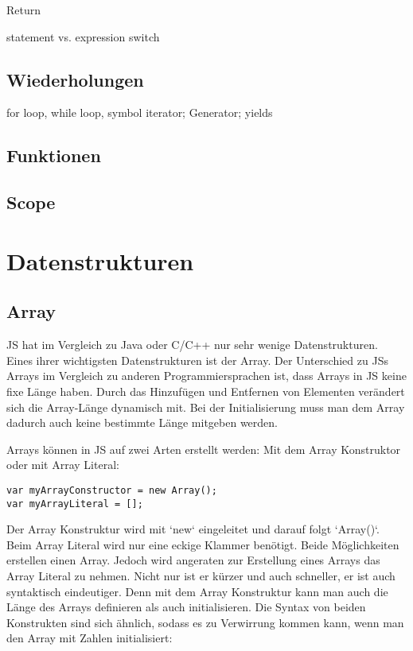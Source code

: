 \documentclass{book}
\begin{document}
Return 

statement vs. expression
switch

\section{Wiederholungen}
for loop, while loop, symbol iterator; Generator; yields

\section{Funktionen}
\section{Scope}

\chapter{Datenstrukturen}
\section{Array}
JS hat im Vergleich zu Java oder C/C++ nur sehr wenige Datenstrukturen. Eines ihrer wichtigsten Datenstrukturen ist der Array. Der Unterschied zu JSs Arrays im Vergleich zu anderen Programmiersprachen ist, dass Arrays in JS keine fixe Länge haben. Durch das Hinzufügen und Entfernen von Elementen verändert sich die Array-Länge dynamisch mit. Bei der Initialisierung muss man dem Array dadurch auch keine bestimmte Länge mitgeben werden.

Arrays können in JS auf zwei Arten erstellt werden: Mit dem Array Konstruktor oder mit Array Literal:
\begin{lstlisting}[caption=Array Konstruktor]
var myArrayConstructor = new Array();
var myArrayLiteral = [];
\end{lstlisting}

Der Array Konstruktur wird mit `new` eingeleitet und darauf folgt `Array()`. Beim Array Literal wird nur eine eckige Klammer benötigt. Beide Möglichkeiten erstellen einen Array. Jedoch wird angeraten zur Erstellung eines Arrays das Array Literal zu nehmen. Nicht nur ist er kürzer und auch schneller, er ist auch syntaktisch eindeutiger. Denn mit dem Array Konstruktur kann man auch die Länge des Arrays definieren als auch initialisieren. Die Syntax von beiden Konstrukten sind sich ähnlich, sodass es zu Verwirrung kommen kann, wenn man den Array mit Zahlen initialisiert:
\end{document}
